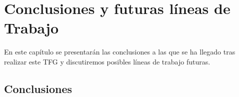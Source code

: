 %
%
%

\chapter{Conclusiones y futuras líneas de Trabajo} \label{chap:Conclusiones} 

En este capítulo se presentarán las conclusiones a las que se ha llegado tras realizar este TFG y discutiremos posibles líneas de trabajo futuras.

\section{Conclusiones}
